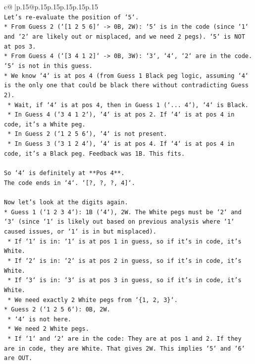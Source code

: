 \documentclass{article}
\begin{document}
{\begin{supertabular}{c@{$\;$}|p{.15\linewidth}@{}p{.15\linewidth}p{.15\linewidth}p{.15\linewidth}p{.15\linewidth}p{.15\linewidth}}
{{{\\ 
\texttt{Let's re{-}evaluate the position of `5`.} \\
\texttt{*   From Guess 2 (`{[}1 2 5 6{]}` {-}> 0B, 2W): `5` is in the code (since `1` and `2` are likely out or misplaced, and we need 2 pegs). `5` is NOT at pos 3.} \\
\texttt{*   From Guess 4 (`{[}3 4 1 2{]}` {-}> 0B, 3W): `3`, `4`, `2` are in the code. `5` is not in this guess.} \\
\texttt{*   We know `4` is at pos 4 (from Guess 1 Black peg logic, assuming `4` is the only one that could be black there without contradicting Guess 2).} \\
\texttt{    *   Wait, if `4` is at pos 4, then in Guess 1 (`... 4`), `4` is Black.} \\
\texttt{    *   In Guess 4 (`3 4 1 2`), `4` is at pos 2. If `4` is at pos 4 in code, it's a White peg.} \\
\texttt{    *   In Guess 2 (`1 2 5 6`), `4` is not present.} \\
\texttt{    *   In Guess 3 (`3 1 2 4`), `4` is at pos 4. If `4` is at pos 4 in code, it's a Black peg. Feedback was 1B. This fits.} \\
\\ 
\texttt{So `4` is definitely at **Pos 4**.} \\
\texttt{The code ends in `4`. `{[}?, ?, ?, 4{]}`.} \\
\\ 
\texttt{Now let's look at the digits again.} \\
\texttt{*   Guess 1 (`1 2 3 4`): 1B (`4`), 2W. The White pegs must be `2` and `3` (since `1` is likely out based on previous analysis where `1` caused issues, or `1` is in but misplaced).} \\
\texttt{    *   If `1` is in: `1` is at pos 1 in guess, so if it's in code, it's White.} \\
\texttt{    *   If `2` is in: `2` is at pos 2 in guess, so if it's in code, it's White.} \\
\texttt{    *   If `3` is in: `3` is at pos 3 in guess, so if it's in code, it's White.} \\
\texttt{    *   We need exactly 2 White pegs from `\{1, 2, 3\}`.} \\
\texttt{*   Guess 2 (`1 2 5 6`): 0B, 2W.} \\
\texttt{    *   `4` is not here.} \\
\texttt{    *   We need 2 White pegs.} \\
\texttt{    *   If `1` and `2` are in the code: They are at pos 1 and 2. If they are in code, they are White. That gives 2W. This implies `5` and `6` are OUT.} \\
}}}
\end{supertabular}}
\end{document}
